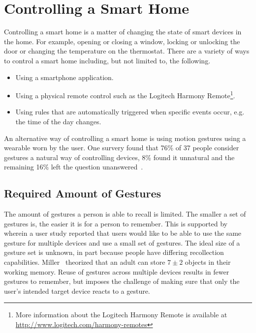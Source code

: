\section{Controlling a Smart Home}
\label{sec:introduction:gesture-control}

Controlling a smart home is a matter of changing the state of smart devices in the home. For example, opening or closing a window, locking or unlocking the door or changing the temperature on the thermostat. There are a variety of ways to control a smart home including, but not limited to, the following.

\begin{itemize}
\item Using a smartphone application.
\item Using a physical remote control such as the Logitech Harmony Remote\footnote{More information about the Logitech Harmony Remote is available at \url{http://www.logitech.com/harmony-remotes}}.
\item Using rules that are automatically triggered when specific events occur, e.g. the time of the day changes.
\end{itemize}

An alternative way of controlling a smart home is using motion gestures using a wearable worn by the user. One survery found that 76\% of 37 people consider gestures a natural way of controlling devices, 8\% found it unnatural and the remaining 16\% left the question unanswered~\cite{Kela2006}.

\subsection{Required Amount of Gestures}

The amount of gestures a person is able to recall is limited. The smaller a set of gestures is, the easier it is for a person to remember. This is supported by~\cite{Kela2006} wherein a user study reported that users would like to be able to use the same gesture for multiple devices and use a small set of gestures.
The ideal size of a gesture set is unknown, in part because people have differing recollection capabilities. Miller~\cite{miller1956magical} theorized that an adult can store $7 \pm 2$ objects in their working memory.
Reuse of gestures across multiple devices results in fewer gestures to remember, but imposes the challenge of making sure that only the user's intended target device reacts to a gesture.

